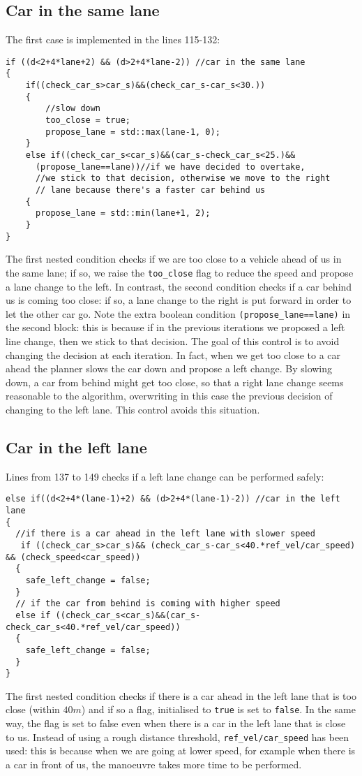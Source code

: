\documentclass{article}
\let\cd\lstinline
\begin{document}
\subsection{Car in the same lane}
The first case is implemented in the lines 115-132:
\begin{lstlisting}
if ((d<2+4*lane+2) && (d>2+4*lane-2)) //car in the same lane
{
    if((check_car_s>car_s)&&(check_car_s-car_s<30.))
    {
        //slow down
        too_close = true;
        propose_lane = std::max(lane-1, 0);
    }
    else if((check_car_s<car_s)&&(car_s-check_car_s<25.)&&
      (propose_lane==lane))//if we have decided to overtake,
      //we stick to that decision, otherwise we move to the right
      // lane because there's a faster car behind us
    {
      propose_lane = std::min(lane+1, 2);
    }
}
\end{lstlisting}
The first nested condition checks if we are too close to a vehicle ahead of us in the same lane; if so, we raise the \cd+too_close+ flag to reduce the speed and propose a lane change to the left. In contrast, the second condition checks if a car behind us is coming too close: if so, a lane change to the right is put forward in order to let the other car go. Note the extra boolean condition \cd+(propose_lane==lane)+ in the second block: this is because if in the previous iterations we proposed a left line change, then we stick to that decision. The goal of this control is to avoid changing the decision at each iteration. In fact, when we get too close to a car ahead the planner slows the car down and propose a left change. By slowing down, a car from behind might get too close, so that a right lane change seems reasonable to the algorithm, overwriting in this case the previous decision of changing to the left lane. This control avoids this situation.

\subsection{Car in the left lane}
Lines from 137 to 149 checks if a left lane change can be performed safely:
\begin{lstlisting}
else if((d<2+4*(lane-1)+2) && (d>2+4*(lane-1)-2)) //car in the left lane
{
  //if there is a car ahead in the left lane with slower speed
   if ((check_car_s>car_s)&& (check_car_s-car_s<40.*ref_vel/car_speed) && (check_speed<car_speed))
  {
    safe_left_change = false;
  }
  // if the car from behind is coming with higher speed
  else if ((check_car_s<car_s)&&(car_s-check_car_s<40.*ref_vel/car_speed))
  {
    safe_left_change = false;
  }
}
\end{lstlisting}
The first nested condition checks if there is a car ahead in the left lane that is too close (within $40m$) and if so a flag, initialised to \cd+true+ is set to \cd+false+. In the same way, the flag is set to false even when there is a car in the left lane that is close to us. Instead of using a rough distance threshold, \cd+ref_vel/car_speed+ has been used: this is because when we are going at lower speed, for example when there is a car in front of us, the manoeuvre takes more time to be performed.
\end{document}
